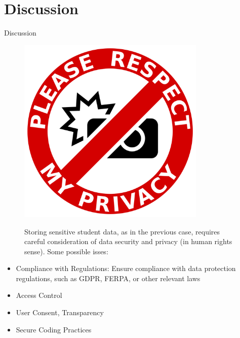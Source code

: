 \section{Discussion}

\begin{frame}{Discussion}

    \begin{figure}
        \centering
        \begin{minipage}{.25\textwidth}
          \centering
          \includegraphics[width=0.8\textwidth]{../../images/privacy.png}
        \end{minipage}%
        \begin{minipage}{.7\textwidth}
            Storing sensitive student data, as in the previous case, requires careful consideration 
            of data security and privacy (in human rights sense). 
            Some possible isses:
        \end{minipage}
    \end{figure}

    \begin{itemize}[<+-|alert@+>]\color{gray}
        \item Compliance with Regulations: Ensure compliance with data protection regulations, such as GDPR, FERPA, or other relevant laws
        \item Access Control
        \item User Consent, Transparency
        \item Secure Coding Practices
    \end{itemize}
    
\end{frame}

